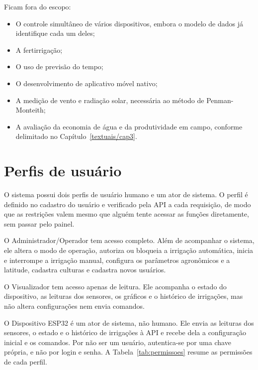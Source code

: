 Ficam fora do escopo: 
\begin{itemize}
    \item O controle simultâneo de vários dispositivos, embora o modelo de dados já identifique cada um deles; 
    \item A fertirrigação;
    \item O uso de previsão do tempo;
    \item O desenvolvimento de aplicativo móvel nativo; 
    \item A medição de vento e radiação solar, necessária ao método de Penman-Monteith; 
    \item A avaliação da economia de água e da produtividade em campo, conforme delimitado no Capítulo~\ref{textuais/cap3}.
\end{itemize}

\section{Perfis de usuário}
\label{sec:perfis}

O sistema possui dois perfis de usuário humano e um ator de sistema. O perfil é definido no cadastro do usuário e verificado pela API a cada requisição, de modo que as restrições valem mesmo que alguém tente acessar as funções diretamente, sem passar pelo painel.

O Administrador/Operador tem acesso completo. Além de acompanhar o sistema, ele altera o modo de operação, autoriza ou bloqueia a irrigação automática, inicia e interrompe a irrigação manual, configura os parâmetros agronômicos e a latitude, cadastra culturas e cadastra novos usuários.

O Visualizador tem acesso apenas de leitura. Ele acompanha o estado do dispositivo, as leituras dos sensores, os gráficos e o histórico de irrigações, mas não altera configurações nem envia comandos.

O Dispositivo ESP32 é um ator de sistema, não humano. Ele envia as leituras dos sensores, o estado e o histórico de irrigações à API e recebe dela a configuração inicial e os comandos. Por não ser um usuário, autentica-se por uma chave própria, e não por login e senha. A Tabela~\ref{tab:permissoes} resume as permissões de cada perfil.

